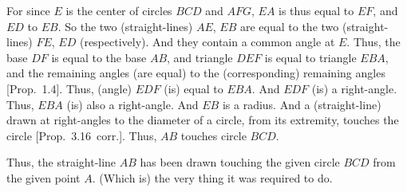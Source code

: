 \begin{Parallel}{}{}
{For since $E$ is the center of circles $BCD$ and $AFG$, $EA$ is thus equal to $EF$,
and $ED$ to $EB$. So the two (straight-lines) $AE$, $EB$ are equal to
the two (straight-lines) $FE$, $ED$ (respectively). And they contain a common angle at $E$.
Thus, the base $DF$ is equal to the base $AB$, and triangle $DEF$ is equal to
triangle $EBA$, and the remaining angles (are equal) to the (corresponding)
remaining angles [Prop.~1.4]. Thus, (angle) $EDF$ (is) equal to $EBA$. And
$EDF$ (is) a right-angle. Thus, $EBA$ (is) also a right-angle. And $EB$ is a radius.
And a (straight-line) drawn at right-angles to the diameter of a circle, from
its extremity,  touches the circle [Prop.~3.16~corr.]. Thus, $AB$ touches circle $BCD$.

Thus, the straight-line $AB$ has been drawn touching the given circle $BCD$ from the given point $A$. (Which is) the very thing it was required to do.}
\end{Parallel}

